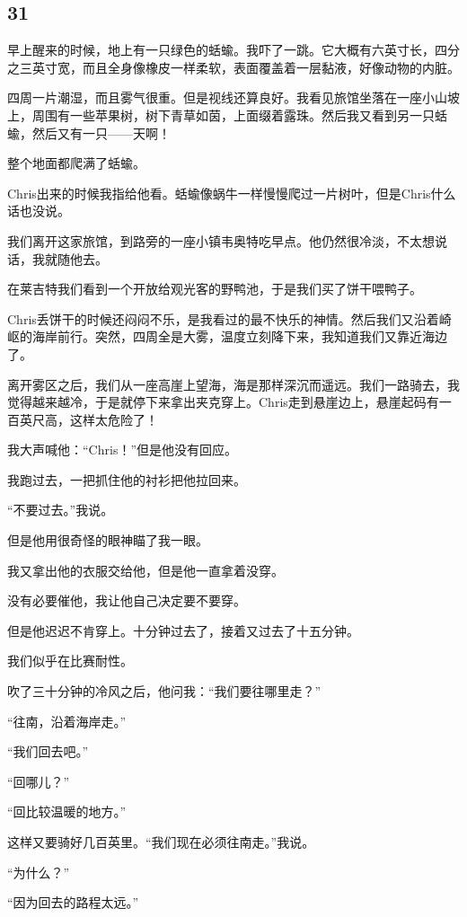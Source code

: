 \documentclass[UTF8]{article}
\begin{document}
\subsection*{31}
\par 早上醒来的时候，地上有一只绿色的蛞蝓。我吓了一跳。它大概有六英寸长，四分之三英寸宽，而且全身像橡皮一样柔软，表面覆盖着一层黏液，好像动物的内脏。
\par 四周一片潮湿，而且雾气很重。但是视线还算良好。我看见旅馆坐落在一座小山坡上，周围有一些苹果树，树下青草如茵，上面缀着露珠。然后我又看到另一只蛞蝓，然后又有一只——天啊！
\par 整个地面都爬满了蛞蝓。
\par Chris出来的时候我指给他看。蛞蝓像蜗牛一样慢慢爬过一片树叶，但是Chris什么话也没说。
\par 我们离开这家旅馆，到路旁的一座小镇韦奥特吃早点。他仍然很冷淡，不太想说话，我就随他去。
\par 在莱吉特我们看到一个开放给观光客的野鸭池，于是我们买了饼干喂鸭子。
\par Chris丢饼干的时候还闷闷不乐，是我看过的最不快乐的神情。然后我们又沿着崎岖的海岸前行。突然，四周全是大雾，温度立刻降下来，我知道我们又靠近海边了。
\par 离开雾区之后，我们从一座高崖上望海，海是那样深沉而遥远。我们一路骑去，我觉得越来越冷，于是就停下来拿出夹克穿上。Chris走到悬崖边上，悬崖起码有一百英尺高，这样太危险了！
\par 我大声喊他：“Chris！”但是他没有回应。
\par 我跑过去，一把抓住他的衬衫把他拉回来。
\par “不要过去。”我说。
\par 但是他用很奇怪的眼神瞄了我一眼。
\par 我又拿出他的衣服交给他，但是他一直拿着没穿。
\par 没有必要催他，我让他自己决定要不要穿。
\par 但是他迟迟不肯穿上。十分钟过去了，接着又过去了十五分钟。
\par 我们似乎在比赛耐性。
\par 吹了三十分钟的冷风之后，他问我：“我们要往哪里走？”
\par “往南，沿着海岸走。”
\par “我们回去吧。”
\par “回哪儿？”
\par “回比较温暖的地方。”
\par 这样又要骑好几百英里。“我们现在必须往南走。”我说。
\par “为什么？”
\par “因为回去的路程太远。”
\end{document}
